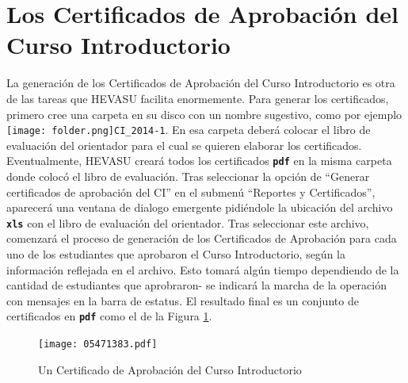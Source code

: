 \documentclass[letterpaper,12pt]{book}
\newcommand{\fileformat}[1]{\textbf{\texttt{#1}}}
\newcommand{\carpeta}[1]
{\texttt{[image: folder.png]}\texttt{#1}}
\begin{document}
\section{Los Certificados de Aprobación del Curso Introductorio}

La generación de los Certificados de Aprobación del Curso Introductorio es otra de las tareas que HEVASU facilita enormemente. Para generar los certificados, primero cree una carpeta en su disco con un nombre sugestivo, como por ejemplo \carpeta{CI\_2014-1}. En esa carpeta deberá colocar el libro de evaluación del orientador para el cual se quieren elaborar los certificados.  Eventualmente, HEVASU creará todos los certificados \fileformat{pdf} en la misma carpeta donde colocó el libro de evaluación. Tras seleccionar la opción de ``Generar certificados de aprobación del CI'' en el submenú ``Reportes y Certificados'', aparecerá una ventana de dialogo emergente pidiéndole la ubicación del archivo \fileformat{xls} con el libro de evaluación del orientador. Tras seleccionar este archivo, comenzará el proceso de generación de los Certificados de Aprobación para cada uno de los estudiantes que aprobaron el Curso Introductorio, según la información reflejada en el archivo. Esto tomará algún tiempo dependiendo de la cantidad de estudiantes que aprobraron- se indicará la marcha de la operación con mensajes en la barra de estatus. El resultado final es un conjunto de certificados en \fileformat{pdf} como el de la Figura \ref{fig:certificado_aprobacion}.

\begin{figure}[!ht]
	\centering
	\texttt{[image: 05471383.pdf]}
	\caption{Un Certificado de Aprobación del Curso Introductorio}
	\label{fig:certificado_aprobacion}
\end{figure}
\end{document}
